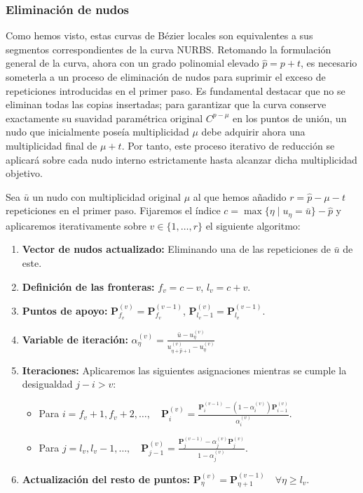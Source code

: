 \documentclass[11pt]{book}
\theoremstyle{plain} %
\theoremstyle{definition} %
\theoremstyle{definition} %
\begin{document}
\subsubsection{Eliminación de nudos}

Como hemos visto, estas curvas de Bézier locales son equivalentes a sus segmentos correspondientes de la curva NURBS.
Retomando la formulación general de la curva, ahora con un grado polinomial elevado $\hat{p}=p+t$, es necesario someterla a un
proceso de eliminación de nudos para suprimir el exceso de repeticiones introducidas en el primer paso. Es fundamental destacar que no se
eliminan todas las copias insertadas; para garantizar que la curva conserve exactamente su suavidad paramétrica original $C^{p-\mu}$
en los puntos de unión, un nudo que inicialmente poseía multiplicidad $\mu$ debe adquirir ahora una multiplicidad final de $\mu+t$.
Por tanto, este proceso iterativo de reducción se aplicará sobre cada nudo interno estrictamente hasta alcanzar dicha multiplicidad objetivo.

Sea $\bar{u}$ un nudo con multiplicidad original $\mu$ al que hemos añadido $r=\hat{p}-\mu-t$ repeticiones en el primer paso. Fijaremos el índice $c= \max \{ \eta \mid u_\eta = \bar{u} \} -\hat{p}$ y aplicaremos iterativamente sobre $v\in\{1, \dots , r\}$ el siguiente algoritmo:

\begin{enumerate}
    \item \textbf{Vector de nudos actualizado:} Eliminando una de las repeticiones de $\bar{u}$ de este.
    \item \textbf{Definición de las fronteras:} $f_v = c - v$, $l_v = c + v$.
    \item \textbf{Puntos de apoyo:} $\mathbf{P}^{(v)}_{f_v} = \mathbf{P}^{(v-1)}_{f_v}$, $\mathbf{P}^{(v)}_{l_v-1} = \mathbf{P}^{(v-1)}_{l_v}$.
    \item \textbf{Variable de iteración:} $\alpha_\eta^{(v)} = \frac{\bar{u} - u_\eta^{(v)}}{u_{\eta+\hat{p}+1}^{(v)} - u_\eta^{(v)}}$
    \item \textbf{Iteraciones:} Aplicaremos las siguientes asignaciones mientras se cumple la desigualdad $j-i>v$:
            \begin{itemize}
                \item Para $i = f_v + 1, f_v + 2, \dots, \quad \mathbf{P}^{(v)}_i = \frac{\mathbf{P}^{(v-1)}_i - (1 - \alpha_i^{(v)}) \mathbf{P}^{(v)}_{i-1}}{\alpha_i^{(v)}}.$
                \item Para $j = l_v, l_v - 1, \dots, \quad \mathbf{P}^{(v)}_{j-1} = \frac{\mathbf{P}^{(v-1)}_j - \alpha_j^{(v)} \mathbf{P}^{(v)}_j}{1 - \alpha_j^{(v)}}.$
            \end{itemize}
    \item \textbf{Actualización del resto de puntos:} $\mathbf{P}^{(v)}_\eta = \mathbf{P}^{(v-1)}_{\eta+1} \quad \forall \eta \ge l_v.$
\end{enumerate}
\end{document}
